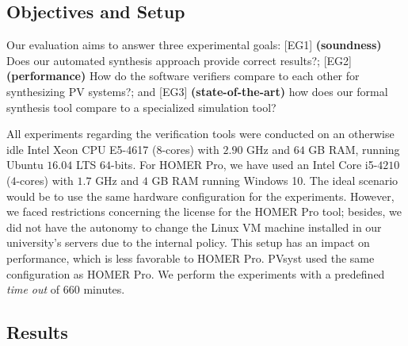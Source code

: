 \documentclass[10pt,journal,compsoc]{IEEEtran}
\begin{document}
\subsection{Objectives and Setup}

Our evaluation aims to answer three experimental goals: [EG1] \textbf{(soundness)} Does our automated synthesis approach provide correct results?; [EG2] \textbf{(performance)} How do the software verifiers compare to each other for synthesizing PV systems?; and [EG3] \textbf{(state-of-the-art)} how does our formal synthesis tool compare to a specialized simulation tool?

All experiments regarding the verification tools were conducted on an otherwise idle Intel Xeon CPU E5-4617 ($8$-cores) with $2.90$ GHz and $64$ GB RAM, running Ubuntu $16.04$ LTS $64$-bits. For HOMER Pro, we have used an Intel Core i5-$4210$ ($4$-cores) with $1.7$ GHz and $4$ GB RAM running Windows 10. The ideal scenario would be to use the same hardware configuration for the experiments. However, we faced restrictions concerning the license for the HOMER Pro tool; besides, we did not have the autonomy to change the Linux VM machine installed in our university's servers due to the internal policy. This setup has an impact on performance, which is less favorable to HOMER Pro. PVsyst used the same configuration as HOMER Pro. We perform the experiments with a predefined \textit{time out} of $660$ minutes.

\subsection{Results}
\end{document}
